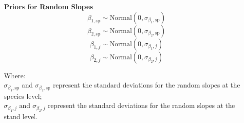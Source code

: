 \documentclass[11pt,letter]{article}
\begin{document}
\textbf{Priors for Random Slopes}
\[
\beta_{1,\text{sp}} \sim \text{Normal}(0, \sigma_{\beta_1,\text{sp}})
\]
\[
\beta_{2,\text{sp}} \sim \text{Normal}(0, \sigma_{\beta_2,\text{sp}})
\]
\[
\beta_{1,j} \sim \text{Normal}(0, \sigma_{\beta_1,j})
\]
\[
\beta_{2,j} \sim \text{Normal}(0, \sigma_{\beta_2,j})
\]

Where:\\
\(\sigma_{\beta_1,\text{sp}}\) and \(\sigma_{\beta_2,\text{sp}}\) represent the standard deviations for the random slopes at the species level;\\
\(\sigma_{\beta_1,j}\) and \(\sigma_{\beta_2,j}\) represent the standard deviations for the random slopes at the stand level.
\end{document}
